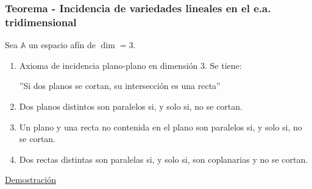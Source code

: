 \documentclass[12pt, a4paper, ones, notitlepage, openany,titlepage]{article}
\newcommand{\demostracion}{\noindent\underline{Demostración}}
\begin{document}
\subsubsection{Teorema - Incidencia de variedades lineales en el e.a. tridimensional}
\noindent Sea $\mathbb{A}$ un espacio afín de $\dim = 3$.
\begin{enumerate}[label=(\alph*)]
	\item Axioma de incidencia plano-plano en dimensión $3$. Se tiene:
	\begin{center}
		''Si dos planos se cortan, su intersección es una recta''
	\end{center}
	\item Dos planos distintos son paralelos si, y solo si, no se cortan.
	\item Un plano y una recta no contenida en el plano son paralelos si, y solo si, no se cortan.
	\item Dos rectas distintas son paralelas si, y solo si, son coplanarias y no se cortan.
\end{enumerate}
\demostracion
\end{document}
